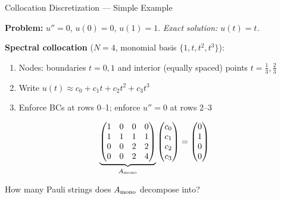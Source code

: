 \documentclass{beamer}
\begin{document}
\begin{frame}{Collocation Discretization — Simple Example}

  \textbf{Problem:} $u'' = 0$, $u(0)=0$, $u(1)=1$. \;
  \emph{Exact solution: $u(t)=t$.}

  \vspace{4pt}
  \textbf{Spectral collocation} ($N=4$, monomial basis $\{1,t,t^2,t^3\}$):
  \begin{enumerate}
    \item Nodes: boundaries $t=0,1$ and interior (equally spaced) points $t=\tfrac{1}{3},\tfrac{2}{3}$
    \item Write $u(t)\approx c_0+c_1 t+c_2 t^2+c_3 t^3$
    \item Enforce BCs at rows 0--1; enforce $u''=0$ at rows 2--3
  \end{enumerate}

  \[
    \underbrace{\begin{pmatrix}
      1 & 0 & 0 & 0 \\
      1 & 1 & 1 & 1 \\
      0 & 0 & 2 & 2 \\
      0 & 0 & 2 & 4
    \end{pmatrix}}_{A_{\rm mono}}
    \begin{pmatrix}c_0\\c_1\\c_2\\c_3\end{pmatrix}
    = \begin{pmatrix}0\\1\\0\\0\end{pmatrix}
  \]

  \vspace{2pt}
  \begin{alertblock}{}
    How many Pauli strings does $A_{\rm mono}$ decompose into?
  \end{alertblock}
\end{frame}
\end{document}
